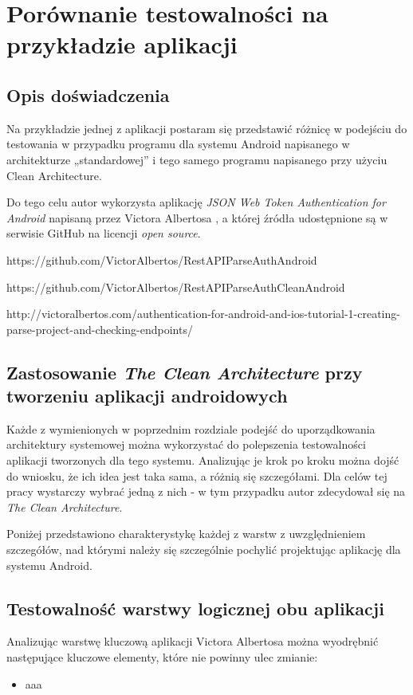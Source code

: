 \chapter{Porównanie testowalności na przykładzie aplikacji}
\label{analiza_testow}

\section{Opis doświadczenia}
Na przykładzie jednej z aplikacji postaram się przedstawić różnicę w podejściu do testowania w przypadku programu dla systemu Android napisanego w architekturze „standardowej” i tego samego programu napisanego przy użyciu Clean Architecture.

Do tego celu autor wykorzysta aplikację \textit{JSON Web Token Authentication for Android} napisaną przez Victora Albertosa , a której źródła udostępnione są w serwisie GitHub na licencji \textit{open source}.

https://github.com/VictorAlbertos/RestAPIParseAuthAndroid

https://github.com/VictorAlbertos/RestAPIParseAuthCleanAndroid

http://victoralbertos.com/authentication-for-android-and-ios-tutorial-1-creating-parse-project-and-checking-endpoints/



\section{Zastosowanie \textit{The Clean Architecture} przy tworzeniu aplikacji androidowych}
\label{clean_android}
Każde z wymienionych w poprzednim rozdziale podejść do uporządkowania architektury systemowej można wykorzystać do polepszenia testowalności aplikacji tworzonych dla tego systemu. Analizując je krok po kroku można dojść do wniosku, że ich idea jest taka sama, a różnią się szczegółami. Dla celów tej pracy wystarczy wybrać jedną z nich - w tym przypadku autor zdecydował się na \textit{The Clean Architecture}.

Poniżej przedstawiono charakterystykę każdej z warstw z uwzględnieniem szczegółów, nad którymi należy się szczególnie pochylić projektując aplikację dla systemu Android.

\section{Testowalność warstwy logicznej obu aplikacji}
\label{android_entities}
Analizując warstwę kluczową aplikacji Victora Albertosa można wyodrębnić następujące kluczowe elementy, które nie powinny ulec zmianie:
\begin{itemize}
\item
aaa
\end{itemize}

